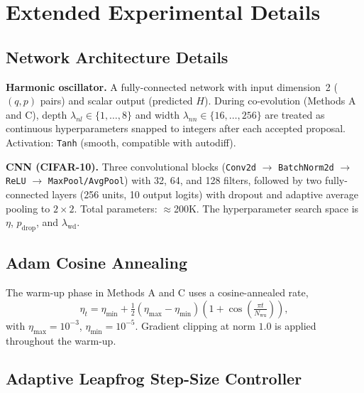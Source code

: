 \documentclass[11pt]{article}
\theoremstyle{definition}
\begin{document}

\section{Extended Experimental Details}
\label{app:experimental}

\subsection{Network Architecture Details}

\textbf{Harmonic oscillator.}
A fully-connected network with input dimension~2 ($(q,p)$ pairs)
and scalar output (predicted $H$). During co-evolution (Methods A
and C), depth $\lambda_{nl} \in \{1,\ldots,8\}$ and width
$\lambda_{nn} \in \{16,\ldots,256\}$ are treated as continuous
hyperparameters snapped to integers after each accepted proposal.
Activation: \texttt{Tanh} (smooth, compatible with autodiff).

\textbf{CNN (CIFAR-10).}
Three convolutional blocks (\texttt{Conv2d} $\to$ \texttt{BatchNorm2d}
$\to$ \texttt{ReLU} $\to$ \texttt{MaxPool/AvgPool}) with 32, 64, and
128 filters, followed by two fully-connected layers (256 units, 10
output logits) with dropout and adaptive average pooling to $2\times2$.
Total parameters: $\approx$200K. The hyperparameter search space is
$\eta$, $p_{\mathrm{drop}}$, and $\lambda_{\mathrm{wd}}$.

\subsection{Adam Cosine Annealing}

The warm-up phase in Methods A and C uses a cosine-annealed rate,
\begin{equation}
\eta_t = \eta_{\min}
  + \tfrac{1}{2}(\eta_{\max}-\eta_{\min})
    \!\left(1+\cos\!\left(\tfrac{\pi t}{N_{\mathrm{wu}}}\right)\right),
\label{eq:cosine}
\end{equation}
with $\eta_{\max}=10^{-3}$, $\eta_{\min}=10^{-5}$.
Gradient clipping at norm $1.0$ is applied throughout the warm-up.

\subsection{Adaptive Leapfrog Step-Size Controller}
\end{document}
